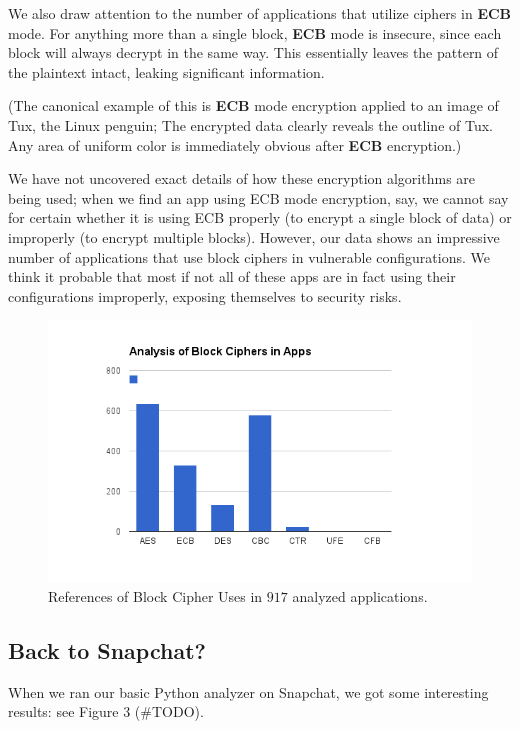 \documentclass[11pt]{article}
\numberwithin{theorem}{subsection}
\begin{document}
We also draw attention to the number of applications that utilize ciphers in \textbf{ECB} mode. For anything more than a single block, 
\textbf{ECB} mode is insecure, since each block will always decrypt in the same way. This essentially leaves the pattern of the 
plaintext intact, leaking significant information. 

(The canonical example of this is \textbf{ECB} mode encryption applied to an image of Tux, the Linux penguin; The encrypted data
clearly reveals the outline of Tux. Any area of uniform color is immediately obvious after \textbf{ECB} encryption.)

We have not uncovered exact details of how these encryption algorithms are being used; when we find an app using ECB mode encryption,
say, we cannot say for certain whether it is using ECB properly (to encrypt a single block of data) or improperly (to encrypt multiple
blocks).  However, our data shows an impressive number of applications that use block ciphers in vulnerable configurations.  We think it
probable that most if not all of these apps are in fact using their configurations improperly, exposing themselves to security risks.

\begin{figure}[H]
  \caption{References of Block Cipher Uses in $917$ analyzed applications.}
  \centering
  \includegraphics[scale=0.8]{fig2.png}
\end{figure}

\subsection{Back to Snapchat?}

When we ran our basic Python analyzer on Snapchat, we got some interesting results: see Figure 3 (\#TODO).
\end{document}
